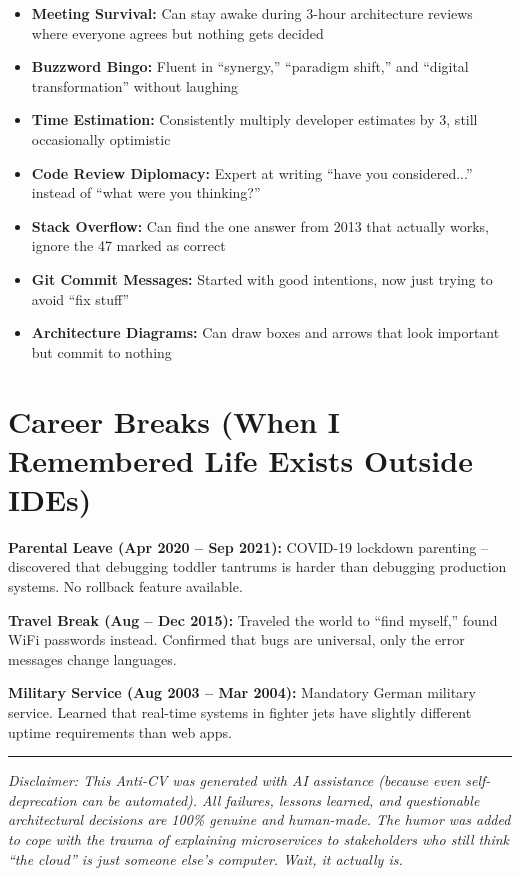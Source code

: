 \documentclass[10pt,a4paper]{article}
\begin{document}
\begin{itemize}[leftmargin=*, topsep=0pt, itemsep=1pt]
\item \textbf{Meeting Survival:} Can stay awake during 3-hour architecture reviews where everyone agrees but nothing gets decided
\item \textbf{Buzzword Bingo:} Fluent in ``synergy,'' ``paradigm shift,'' and ``digital transformation'' without laughing
\item \textbf{Time Estimation:} Consistently multiply developer estimates by 3, still occasionally optimistic
\item \textbf{Code Review Diplomacy:} Expert at writing ``have you considered...'' instead of ``what were you thinking?''
\item \textbf{Stack Overflow:} Can find the one answer from 2013 that actually works, ignore the 47 marked as correct
\item \textbf{Git Commit Messages:} Started with good intentions, now just trying to avoid ``fix stuff''
\item \textbf{Architecture Diagrams:} Can draw boxes and arrows that look important but commit to nothing
\end{itemize}

\section*{Career Breaks (When I Remembered Life Exists Outside IDEs)}

\textbf{Parental Leave (Apr 2020 -- Sep 2021):} COVID-19 lockdown parenting -- discovered that debugging toddler tantrums is harder than debugging production systems. No rollback feature available.

\textbf{Travel Break (Aug -- Dec 2015):} Traveled the world to ``find myself,'' found WiFi passwords instead. Confirmed that bugs are universal, only the error messages change languages.

\textbf{Military Service (Aug 2003 -- Mar 2004):} Mandatory German military service. Learned that real-time systems in fighter jets have slightly different uptime requirements than web apps.

\vspace{8pt}
\hrule
\vspace{4pt}
{\footnotesize\textit{Disclaimer: This Anti-CV was generated with AI assistance (because even self-deprecation can be automated). All failures, lessons learned, and questionable architectural decisions are 100\% genuine and human-made. The humor was added to cope with the trauma of explaining microservices to stakeholders who still think ``the cloud'' is just someone else's computer. Wait, it actually is.}}

\vfill
\end{document}
